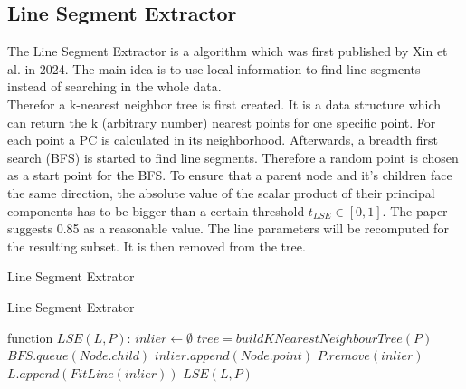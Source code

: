 \documentclass{scp}
\begin{document}
\subsection*{Line Segment Extractor} \label{sec:LSE}
The Line Segment Extractor is a algorithm which was first published by Xin et al. \cite{Xin} in 2024. The main idea is to use local information to find line segments instead of searching in the whole data. \\
Therefor a k-nearest neighbor tree is first created. It is a data structure which can return the k (arbitrary number) nearest points for one specific point. For each point a PC is calculated in its neighborhood. Afterwards, a breadth first search (BFS) is started to find line segments. Therefore a random point is chosen as a start point for the BFS. To ensure that a parent node and it's children face the same direction, the absolute value of the scalar product of their principal components has to be bigger than a certain threshold $t_{LSE} \in [0, 1]$.
The paper suggests 0.85 as a reasonable value. The line parameters will be recomputed for the resulting subset. It is then removed from the tree.


\begin{algorithm}[h]
\caption{Line Segment Extrator}\label{Split}
\begin{algorithmic}[1]
\caption{Line Segment Extrator}
\State function $LSE(L,P)$:
    \State \Return
\EndIf
\State $inlier \leftarrow \emptyset$
\State $tree = buildKNearestNeighbourTree(P)$
        \State $BFS.queue(Node.child)$
        \State $inlier.append(Node.point)$
    \EndIf
\EndFor
\State $P.remove(inlier)$
\State $L.append(FitLine(inlier))$
\State $LSE(L,P)$
\end{algorithmic}
\end{algorithm}
\end{document}

